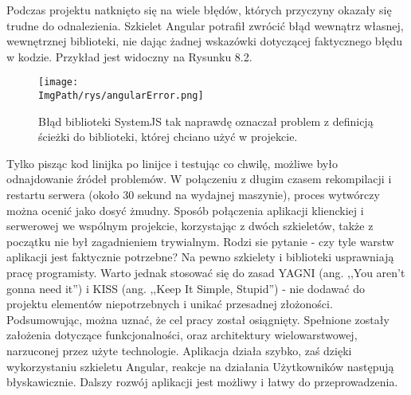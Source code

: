 \documentclass[a4paper,12pt,twoside,openany]{report}
\newcommand{\ImgPath}{.}
\begin{document}
Podczas projektu natknięto się na wiele błędów, których przyczyny okazały się trudne do odnalezienia. Szkielet Angular potrafił zwrócić błąd wewnątrz własnej, wewnętrznej biblioteki, nie dając żadnej wskazówki dotyczącej faktycznego błędu w kodzie. Przykład jest widoczny na Rysunku 8.2.
				\begin{sidewaysfigure}[!htbp]
					\begin{center}
						\centering
						\texttt{[image: \\ImgPath/rys/angularError.png]}
					\end{center}
					\caption{Błąd biblioteki SystemJS tak naprawdę oznaczał problem z definicją ścieżki do biblioteki, której chciano użyć w projekcie.}
					\label{UMLTS}
				\end{sidewaysfigure}
Tylko pisząc kod linijka po linijce i testując co chwilę, możliwe było odnajdowanie źródeł problemów. W połączeniu z długim czasem rekompilacji i restartu serwera (około 30 sekund na wydajnej maszynie), proces wytwórczy można ocenić jako dosyć żmudny. Sposób połączenia aplikacji klienckiej i serwerowej we wspólnym projekcie, korzystając z dwóch szkieletów, także z początku nie był zagadnieniem trywialnym. Rodzi sie pytanie - czy tyle warstw aplikacji jest faktycznie potrzebne? Na pewno szkielety i biblioteki usprawniają pracę programisty. Warto jednak stosować się do zasad YAGNI (ang. ,,You aren't gonna need it'') i KISS (ang. ,,Keep It Simple, Stupid'') - nie dodawać do projektu elementów niepotrzebnych i unikać przesadnej złożoności. \\
Podsumowując, można uznać, że cel pracy został osiągnięty. Spełnione zostały założenia dotyczące funkcjonalności, oraz architektury wielowarstwowej, narzuconej przez użyte technologie. Aplikacja działa szybko, zaś dzięki wykorzystaniu szkieletu Angular, reakcje na działania Użytkowników następują błyskawicznie. Dalszy rozwój aplikacji jest możliwy i łatwy do przeprowadzenia.
\end{document}
